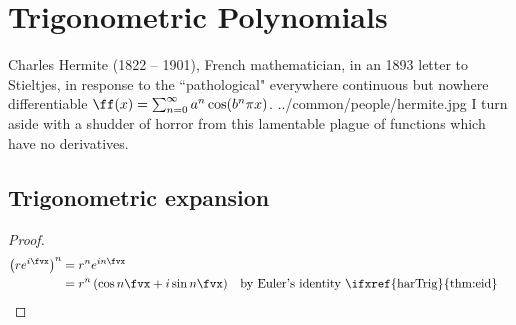 \chapter{Trigonometric Polynomials}
\label{chp:trigpoly}
\label{app:trigpoly}
\qboxnps
  {Charles Hermite (1822 -- 1901), French mathematician, 
    {\footnotesize in an 1893 letter to Stieltjes, 
    in response to the ``pathological" everywhere continuous 
    but nowhere differentiable  
    $\ff(x)=\sum_{n=0}^\infty a^n \cos(b^n\pi x)$.}\footnotemark
  }
  {../common/people/hermite.jpg}
  {I turn aside with a shudder of horror from this lamentable 
   plague of functions which have no derivatives.}

\section{Trigonometric expansion}

\begin{theorem}
\label{thm:demoivre}
\end{theorem}
\begin{proof}
\begin{align*}
    \left( r e^{i\fvx} \right)^n
    &= r^n e^{in\fvx}
  \\&= r^n \left(\cos n\fvx + i\sin n\fvx \right)
    && \text{by Euler's identity \ifxref{harTrig}{thm:eid}}
\end{align*}
\end{proof}

